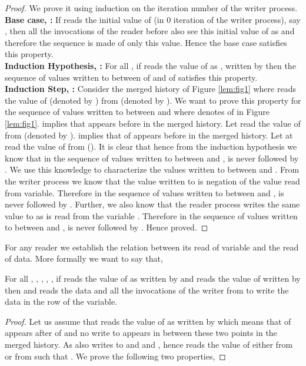 \begin{description}
\begin{proof}
We prove it using induction on the iteration number of the writer process. \\
\textbf{Base case, :} If  reads the initial value of  (in 0 iteration of the writer process), say , then all the invocations of the reader before  also see this initial value of  as  and therefore the sequence is made of only this value. Hence the base case satisfies this property.\\
\textbf{Induction Hypothesis, :} For all , if  reads the value of  as , written by  then the sequence of values written to  between 
 of  and  of  satisfies this property.\\
\textbf{Induction Step, :} Consider the merged history of Figure \ref{lem:fig1} where  reads the value of (denoted by ) from  (denoted by ). We want to prove this property for the sequence of values written to  between  and  where  denotes  of  in Figure \ref{lem:fig1}. \ul{} implies that  appears before  in the merged history. Let  read the value of  from  (denoted by ). \ul{} implies that  of  appears before  in the merged history. Let  at  read the value of  from (). It is clear that  hence from the induction hypothesis we know that in the sequence of values written to  between  and ,  is never followed by . We use this knowledge to characterize the values written to  between  and . From the writer process we know that the value written to  is negation of the value read from  variable. Therefore in the sequence of values written to  between  and ,  is never followed by . Further, we also know that the reader process writes the same value to  as is read from the  variable . Therefore in the sequence of values written to  between  and ,  is never followed by . Hence proved.
\end{proof}
 For any reader we establish the relation between its read of variable  and the read of data. More formally we want to say that,
\begin{lemma}\label{finalaim}
 For all , , , , , if  reads the value of  as  written by  
 and reads the value of  written by  then  and  reads the data  and 
 all the invocations of the writer from  to  write the data in the row  of the  variable.
\end{lemma}
\begin{proof}
Let us assume that  reads the value of  as  written by  which means that  of  appears after  of  and no write to  appears in between these two points in the merged history. As  also writes to  and \ul{} and \ul{}, hence  reads the value of  either from  or from  such that . We prove the following two properties,

\end{proof}
\end{description}
